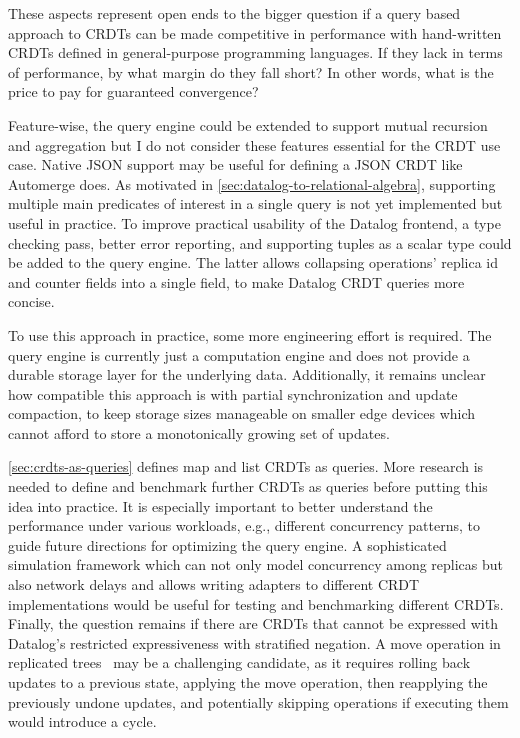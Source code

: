 These aspects represent open ends to the bigger question if a query based
approach to \acp{CRDT} can be made competitive in performance with hand-written
\acp{CRDT} defined in general-purpose programming languages.
If they lack in terms of performance, by what margin do they fall short?
In other words, what is the price to pay for guaranteed convergence?

Feature-wise, the query engine could be extended to support mutual recursion
and aggregation but I do not consider these features essential for the
\ac{CRDT} use case.
Native JSON support may be useful for defining a JSON \ac{CRDT} like Automerge does.
As motivated in \ref{sec:datalog-to-relational-algebra}, supporting multiple
main predicates of interest in a single query is not yet implemented but useful
in practice.
To improve practical usability of the Datalog frontend,
a type checking pass, better error reporting, and supporting tuples as a scalar
type could be added to the query engine.
The latter allows collapsing operations' replica id and counter fields
into a single field, to make Datalog \ac{CRDT} queries more concise.

To use this approach in practice, some more engineering effort is required.
The query engine is currently just a computation engine and does not provide
a durable storage layer for the underlying data.
Additionally, it remains unclear how compatible this approach is with
partial synchronization and update compaction, to keep storage sizes manageable
on smaller edge devices which cannot afford to store a monotonically growing
set of updates.

\ref{sec:crdts-as-queries} defines map and list \acp{CRDT} as queries.
More research is needed to define and benchmark further \acp{CRDT} as queries
before putting this idea into practice.
It is especially important to better understand the performance under various
workloads, e.g., different concurrency patterns, to guide future directions
for optimizing the query engine.
A sophisticated simulation framework which can not only model concurrency among
replicas but also network delays and allows writing adapters to different
\ac{CRDT} implementations would be useful for testing and benchmarking
different \acp{CRDT}.
Finally, the question remains if there are \acp{CRDT} that cannot be expressed
with Datalog's restricted expressiveness with stratified negation.
A move operation in replicated trees~\cite{moveop1,moveop2} may be a challenging
candidate, as it requires rolling back updates to a previous state,
applying the move operation, then reapplying the previously undone updates,
and potentially skipping operations if executing them would introduce a cycle.

